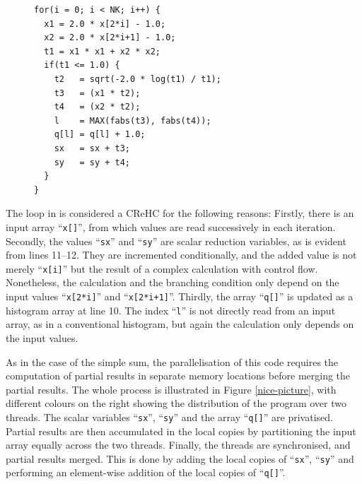 \begin{figure}[h]
\begin{lstlisting}[language=MyCpp, label={complex-reduction-figure}, caption=
   {Example of a Complex Reduction and Histogram Computation:
    The bottleneck from the NAS Parallel Benchmarks can be parallelised as a
    reduction by privatising ``\texttt{sx}'', ``\texttt{sy}'',
    ``\texttt{q[]}''.}]
for(i = 0; i < NK; i++) {
  x1 = 2.0 * x[2*i] - 1.0;
  x2 = 2.0 * x[2*i+1] - 1.0;
  t1 = x1 * x1 + x2 * x2;
  if(t1 <= 1.0) {
    t2   = sqrt(-2.0 * log(t1) / t1);
    t3   = (x1 * t2);
    t4   = (x2 * t2);
    l    = MAX(fabs(t3), fabs(t4));
    q[l] = q[l] + 1.0;
    sx   = sx + t3;
    sy   = sy + t4;
  }
}
\end{lstlisting}
\end{figure}

    The loop in  is considered a CReHC for the
    following reasons:
    Firstly, there is an input array ``\texttt{x[]}'', from which values are
    read successively in each iteration.
    Secondly, the values ``\texttt{sx}'' and ``\texttt{sy}'' are scalar
    reduction variables, as is evident from lines 11--12.
    They are incremented conditionally, and the added value is not merely
    ``\texttt{x[i]}'' but the result of a complex calculation with control flow.
    Nonetheless, the calculation and the branching condition only depend on the
    input values ``\texttt{x[2*i]}'' and ``\texttt{x[2*i+1]}''.
    Thirdly, the array ``\texttt{q[]}'' is updated as a histogram array at
    line 10.
    The index ``\texttt{l}'' is not directly read from an input array, as in a
    conventional histogram, but again the calculation only depends on the input
    values.

    As in the case of the simple sum, the parallelisation of this code
    requires the computation of partial results in separate memory locations
    before merging the partial results.
    The whole process is illustrated in Figure \ref{nice-picture}, with
    different colours on the right showing the distribution of the program
    over two threads.
    The scalar variables ``\texttt{sx}'', ``\texttt{sy}'' and the array
    ``\texttt{q[]}'' are privatised.
    Partial results are then accumulated in the local copies by partitioning the
    input array equally across the two threads. 
    Finally, the threads are synchronised, and partial results merged.
    This is done by adding the local copies of ``\texttt{sx}'', ``\texttt{sy}''
    and performing an element-wise addition of the local copies of
    ``\texttt{q[]}''. 

